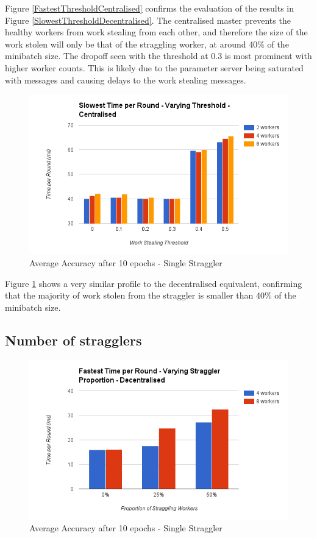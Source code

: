 \documentclass[12pt]{article}
\begin{document}
Figure \ref{FastestThresholdCentralised} confirms the evaluation of the results in Figure  \ref{SlowestThresholdDecentralised}. The centralised master prevents the healthy workers from work stealing from each other, and therefore the size of the work stolen will only be that of the straggling worker, at around 40\% of the minibatch size. The dropoff seen with the threshold at 0.3 is most prominent with higher worker counts. This is likely due to the parameter server being saturated with messages and causing delays to the work stealing messages.

\begin{figure}[H]
  \centering
  \includegraphics[width=6in]{SlowestThresholdCentralised}
  \caption[]{Average Accuracy after 10 epochs - Single Straggler}
  \label{SlowestThresholdCentralised}
\end{figure}

Figure \ref{SlowestThresholdCentralised} shows a very similar profile to the decentralised equivalent, confirming that the majority of work stolen from the straggler is smaller than 40\% of the minibatch size.

\subsection{Number of stragglers}

\begin{figure}[H]
  \centering
  \includegraphics[width=6in]{FastestStragglerDecentralised}
  \caption[]{Average Accuracy after 10 epochs - Single Straggler}
  \label{FastestStragglerDecentralised}
\end{figure}
\end{document}
